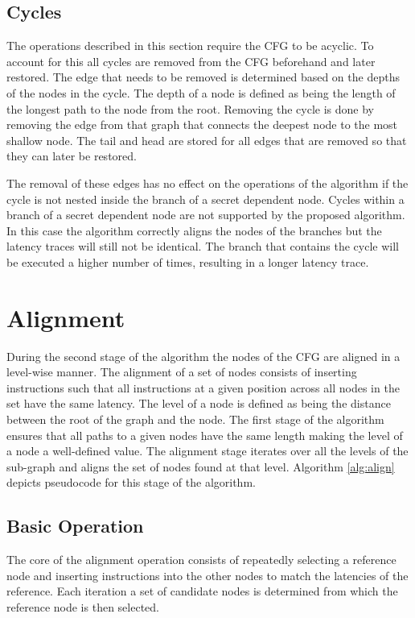 \subsection{Cycles}
The operations described in this section require the CFG to be acyclic.
To account for this all cycles are removed from the CFG beforehand and later restored. 
The edge that needs to be removed is determined based on the depths of the nodes in the cycle. 
The depth of a node is defined as being the length of the longest path to the node from the root. 
Removing the cycle is done by removing the edge from that graph that connects the deepest node to the most shallow node. 
The tail and head are stored for all edges that are removed so that they can later be restored. 

The removal of these edges has no effect on the operations of the algorithm if the cycle is not nested inside the branch of a secret dependent node.  
Cycles within a branch of a secret dependent node are not supported by the proposed algorithm.
In this case the algorithm correctly aligns the nodes of the branches but the latency traces will still not be identical.
The branch that contains the cycle will be executed a higher number of times, resulting in a longer latency trace. 


\section{Alignment} \label{seq:alignment}
During the second stage of the algorithm the nodes of the CFG are aligned in a level-wise manner. 
The alignment of a set of nodes consists of inserting instructions such that all instructions at a given position across all nodes in the set have the same latency. 
The level of a node is defined as being the distance between the root of the graph and the node. The first stage of the algorithm ensures that all paths to a given nodes have the same length making the level of a node a 
well-defined value. The alignment stage iterates over all the levels of the sub-graph and aligns the set of nodes found at that level. Algorithm \ref{alg:align} depicts pseudocode for this stage of the algorithm.

\subsection{Basic Operation}
The core of the alignment operation consists of repeatedly selecting a reference node and inserting instructions into the other nodes to match the latencies of the reference. 
Each iteration a set of candidate nodes is determined from which the reference node is then selected. 

